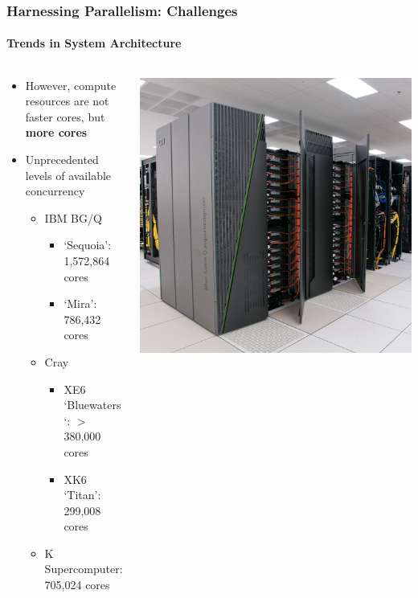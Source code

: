 {\begin{frame}[shrink]
\frametitle{Harnessing Parallelism: Challenges}
\framesubtitle{Trends in System Architecture}
  \begin{columns}
    \begin{column}{0.60\textwidth}
      \begin{itemize}
      \item However, compute resources are not faster cores, but \textbf{more cores}
      \item Unprecedented levels of available concurrency
        \begin{itemize}
        \item IBM BG/Q
          \begin{itemize}
          \item `Sequoia': 1,572,864 cores
          \item `Mira': 786,432 cores
          \end{itemize}
        \item Cray
          \begin{itemize}
          \item XE6 `Bluewaters`: $>$ 380,000 cores
          \item XK6 `Titan': 299,008 cores
          \end{itemize}
        \item K Supercomputer: 705,024 cores
        \end{itemize}
      \end{itemize}
    \end{column}
    \begin{column}{0.40\textwidth}
      \includegraphics[width=1\textwidth]{figures/mira.jpg}
    \end{column}
  \end{columns}


\end{frame}}
